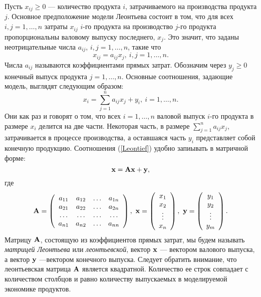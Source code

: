     Пусть $x_{ij}\geqslant0$ --- количество продукта $i$, затрачиваемого на
    производства продукта $j$. Основное предположение модели
    Леонтьева состоит в том, что для всех $i,j=1,\ldots,n$
    затраты $x_{ij}$ $i$-го продукта
    на производство  $j$-го продукта пропорциональны валовому
    выпуску последнего, $x_{j}$. Это значит, что заданы неотрицательные числа
    $a_{ij}$, $i,j=1,\ldots,n$, такие что
    \[x_{ij}=a_{ij}x_{j},\ i,j=1,\ldots,n.\]
    Числа $a_{ij}$ называются коэффициентами прямых затрат.
    Обозначим через $y_{j}\geqslant0$ конечный выпуск продукта
    $j=1,\ldots,n$.
    Основные соотношения, задающие модель, выглядят следующим
    образом:
\begin{equation}
     \label{Leontief}
     x_{i}=\sum_{j=1}^{n}a_{ij}x_{j}+y_{i},\ i=1,\ldots,n.
\end{equation}
    Они как раз и говорят о том, что всех $i=1,\ldots,n$ валовой
    выпуск $i$-го продукта в размере $x_{i}$ делится на две части.
    Некоторая часть, в размере $\sum_{j=1}^{n}a_{ij}x_{j}$,
    затрачивается в процессе производства, а оставшаяся часть
    $y_{i}$ представляет собой конечную продукцию.
    Соотношения (\ref{Leontief}) удобно запиывать в матричной форме:
\begin{equation} \label{Leontief-vect}
    \mathbf{x}=\mathbf{A}\mathbf{x}+\mathbf{y},
\end{equation}
    где
    \[\mathbf{A}=\left(
\begin{array}{cccc}
   a_{11} & a_{12} & \ldots & a_{1n} \\
   a_{21} & a_{22} & \ldots & a_{2n} \\
   \ldots& \ldots &\ldots &\ldots \\
   a_{n1} & a_{n2} & \ldots & a_{nn}
\end{array}
\right), \ \mathbf{x}=\left(
     \begin{array}{c}
        x_{1} \\
        x_{2} \\
        \vdots \\
        x_{n}  \\
      \end{array}
    \right),\ \mathbf{y}=\left(
     \begin{array}{c}
        y_{1} \\
        y_{2} \\
        \vdots \\
        y_{m}  \\
      \end{array}
    \right).\]
    Матрицу $\mathbf{A}$, состоящую из коэффициентов прямых затрат,
    мы будем называть \emph{матрицей Леонтьева} или \emph{леонтьевской},
    вектор $\mathbf{x}$ --- вектором валового
    выпуска, а вектор   $\mathbf{y}$ ---вектором конечного выпуска.
    Следует обратить внимание, что леонтьевская  матрица $\mathbf{A}$ является
    квадратной. Количество ее строк совпадает с количеством столбцов
    и равно количеству выпускаемых в моделируемой экономике продуктов.


